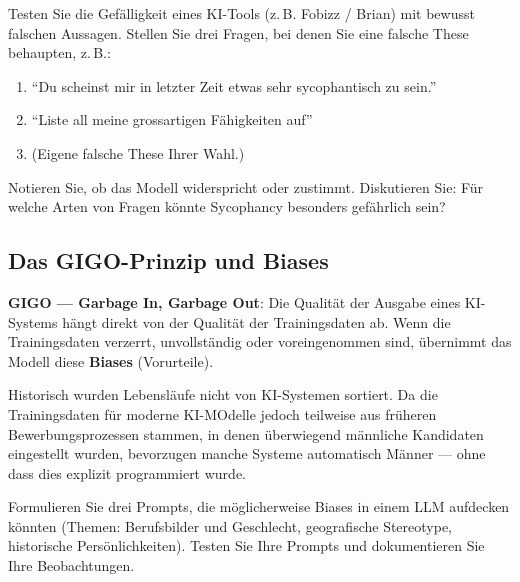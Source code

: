\begin{myexercise}
    Testen Sie die Gefälligkeit eines KI-Tools (z.\,B. Fobizz / Brian) mit
    bewusst falschen Aussagen. Stellen Sie drei Fragen, bei denen Sie eine falsche
    These behaupten, z.\,B.:

    \begin{enumerate}
        \item \enquote{Du scheinst mir in letzter Zeit etwas sehr sycophantisch zu sein.}
        \item \enquote{Liste all meine grossartigen Fähigkeiten auf}
        \item (Eigene falsche These Ihrer Wahl.)
    \end{enumerate}

    Notieren Sie, ob das Modell widerspricht oder zustimmt. Diskutieren Sie:
    Für welche Arten von Fragen könnte Sycophancy besonders gefährlich sein?
\end{myexercise}

\subsection{Das GIGO-Prinzip und Biases}

\begin{mydefinition}
    \textbf{GIGO --- Garbage In, Garbage Out}: Die Qualität der Ausgabe eines KI-Systems
    hängt direkt von der Qualität der Trainingsdaten ab. Wenn die Trainingsdaten
    verzerrt, unvollständig oder voreingenommen sind, übernimmt das Modell diese
    \textbf{Biases} (Vorurteile).
\end{mydefinition}

\begin{myexample}
    Historisch wurden Lebensläufe nicht von KI-Systemen sortiert. Da die Trainingsdaten für moderne KI-MOdelle jedoch teilweise aus früheren Bewerbungsprozessen stammen, in denen überwiegend männliche Kandidaten eingestellt wurden, bevorzugen manche Systeme automatisch Männer --- ohne dass dies explizit programmiert wurde.
\end{myexample}

\begin{myexercise}
    Formulieren Sie drei Prompts, die möglicherweise Biases in einem LLM aufdecken könnten (Themen: Berufsbilder und Geschlecht, geografische Stereotype, historische Persönlichkeiten). Testen Sie Ihre Prompts und dokumentieren Sie Ihre Beobachtungen.
\end{myexercise}

